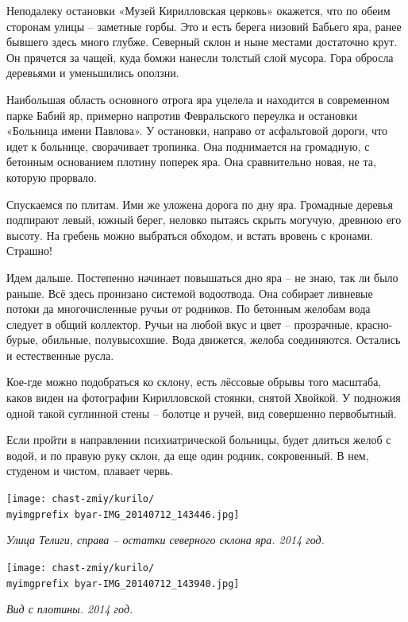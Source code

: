 Неподалеку остановки «Музей Кирилловская церковь» окажется, что по обеим сторонам улицы – заметные горбы. Это и есть берега низовий Бабьего яра, ранее бывшего здесь много глубже. Северный склон и ныне местами достаточно крут. Он прячется за чащей, куда бомжи нанесли толстый слой мусора. Гора обросла деревьями и уменьшились оползни.

Наибольшая область основного отрога яра уцелела и находится в современном парке Бабий яр, примерно напротив Февральского переулка и остановки «Больница имени Павлова». У остановки, направо от асфальтовой дороги, что идет к больнице, сворачивает тропинка. Она поднимается на громадную, с бетонным основанием плотину поперек яра. Она сравнительно новая, не та, которую прорвало.

Спускаемся по плитам. Ими же уложена дорога по дну яра. Громадные деревья подпирают левый, южный берег, неловко пытаясь скрыть могучую, древнюю его высоту. На гребень можно выбраться обходом, и встать вровень с кронами. Страшно!

Идем дальше. Постепенно начинает повышаться дно яра – не знаю, так ли было раньше. Всё здесь пронизано системой водоотвода. Она собирает ливневые потоки да многочисленные ручьи от родников. По бетонным желобам вода следует в общий коллектор. Ручьи на любой вкус и цвет – прозрачные, красно-бурые, обильные, полувысохшие. Вода движется, желоба соединяются. Остались и естественные русла.

Кое-где можно подобраться ко склону, есть лёссовые обрывы того масштаба, каков виден на фотографии Кирилловской стоянки, снятой Хвойкой. У подножия одной такой суглинной стены – болотце и ручей, вид совершенно первобытный.

Если пройти в направлении психиатрической больницы, будет длиться желоб с водой, и по правую руку склон, да еще один родник, сокровенный. В нем, студеном и чистом, плавает червь.

\begin{center}
\texttt{[image: chast-zmiy/kurilo/\\myimgprefix byar-IMG\_20140712\_143446.jpg]}

\textit{Улица Телиги, справа – остатки северного склона яра. 2014 год.}
\end{center}


\begin{center}
\texttt{[image: chast-zmiy/kurilo/\\myimgprefix byar-IMG\_20140712\_143940.jpg]}

\textit{Вид с плотины. 2014 год.}
\end{center}

